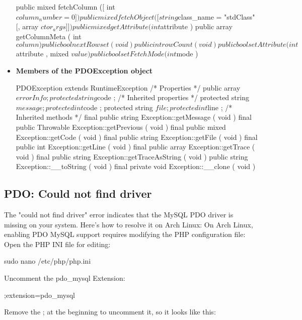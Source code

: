 \documentclass{report}
\begin{document}
\begin{itemize}
\begin{phpcode}
{                public mixed fetchColumn ([ int $column_number = 0 ] )
                public mixed fetchObject ([ string $class_name = "stdClass" [, array $ctor_args ]] )
                public mixed getAttribute ( int $attribute )
                public array getColumnMeta ( int $column )
                public bool nextRowset ( void )
                public int rowCount ( void )
                public bool setAttribute ( int $attribute , mixed $value )
                public bool setFetchMode ( int $mode )
            }
            \end{phpcode}
        \item \textbf{Members of the PDOException object}
            \bigbreak \noindent 
            \begin{phpcode}
                PDOException extends RuntimeException {
                    /* Properties */
                    public array $errorInfo ;
                    protected string $code ;
                    /* Inherited properties */
                    protected string $message ;
                    protected int $code ;
                    protected string $file ;
                    protected int $line ;
                    /* Inherited methods */
                    final public string Exception::getMessage ( void )
                    final public Throwable Exception::getPrevious ( void )
                    final public mixed Exception::getCode ( void )
                    final public string Exception::getFile ( void )
                    final public int Exception::getLine ( void )
                    final public array Exception::getTrace ( void )
                    final public string Exception::getTraceAsString ( void )
                    public string Exception::__toString ( void )
                    final private void Exception::__clone ( void )
                }
            \end{phpcode}
    \end{itemize}

    \bigbreak \noindent 
    \subsection{PDO: Could not find driver}
    \bigbreak \noindent 
    The "could not find driver" error indicates that the MySQL PDO driver is missing on your system. Here’s how to resolve it on Arch Linux:
    \bigbreak \noindent 
    On Arch Linux, enabling PDO MySQL support requires modifying the PHP configuration file:
    \bigbreak \noindent 
    Open the PHP INI file for editing:
    \bigbreak \noindent 
    \begin{bashcode}
        sudo nano /etc/php/php.ini
    \end{bashcode}
    \bigbreak \noindent 
    Uncomment the pdo\_mysql Extension:
    \bigbreak \noindent 
    \begin{bashcode}
    ;extension=pdo_mysql
    \end{bashcode}
    \bigbreak \noindent 
    Remove the ; at the beginning to uncomment it, so it looks like this:
\end{document}
